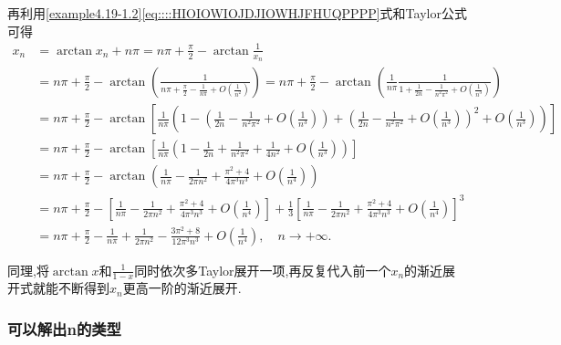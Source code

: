 \documentclass[../../main.tex]{subfiles}%
\begin{document}
\begin{solution}
再利用\eqref{example4.19-1.2}\eqref{eq::::HIOIOWIOJDJIOWHJFHUQPPPP}式和Taylor公式可得
\begin{align*}
x_n&=\arctan x_n+n\pi =n\pi +\frac{\pi}{2}-\arctan \frac{1}{x_n}\\
&=n\pi +\frac{\pi}{2}-\arctan \left( \frac{1}{n\pi +\frac{\pi}{2}-\frac{1}{n\pi}+O\left( \frac{1}{n^2} \right)} \right) =n\pi +\frac{\pi}{2}-\arctan \left( \frac{1}{n\pi}\frac{1}{1+\frac{1}{2n}-\frac{1}{n^2\pi ^2}+O\left( \frac{1}{n^3} \right)} \right)\\
&=n\pi +\frac{\pi}{2}-\arctan \left[ \frac{1}{n\pi}\left( 1-\left( \frac{1}{2n}-\frac{1}{n^2\pi ^2}+O\left( \frac{1}{n^3} \right) \right) +\left( \frac{1}{2n}-\frac{1}{n^2\pi ^2}+O\left( \frac{1}{n^3} \right) \right) ^2+O\left( \frac{1}{n^3} \right) \right) \right]\\
&=n\pi +\frac{\pi}{2}-\arctan \left[ \frac{1}{n\pi}\left( 1-\frac{1}{2n}+\frac{1}{n^2\pi ^2}+\frac{1}{4n^2}+O\left( \frac{1}{n^3} \right) \right) \right]\\
&=n\pi +\frac{\pi}{2}-\arctan \left( \frac{1}{n\pi}-\frac{1}{2\pi n^2}+\frac{\pi ^2+4}{4\pi ^3n^3}+O\left( \frac{1}{n^4} \right) \right)\\
&=n\pi +\frac{\pi}{2}-\left[ \frac{1}{n\pi}-\frac{1}{2\pi n^2}+\frac{\pi ^2+4}{4\pi ^3n^3}+O\left( \frac{1}{n^4} \right) \right] +\frac{1}{3}\left[ \frac{1}{n\pi}-\frac{1}{2\pi n^2}+\frac{\pi ^2+4}{4\pi ^3n^3}+O\left( \frac{1}{n^4} \right) \right] ^3\\
&=n\pi +\frac{\pi}{2}-\frac{1}{n\pi}+\frac{1}{2\pi n^2}-\frac{3\pi ^2+8}{12\pi ^3n^3}+O\left( \frac{1}{n^4} \right) ,\quad n\rightarrow +\infty .
\end{align*}

同理,将$\arctan x$和$\frac{1}{1-x}$同时依次多Taylor展开一项,再反复代入前一个$x_n$的渐近展开式就能不断得到$x_n$更高一阶的渐近展开.
\end{solution}



\subsubsection{可以解出n的类型}
\end{document}
